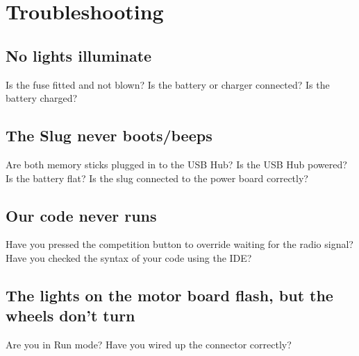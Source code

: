 \documentclass[a4paper, 12pt]{article}
\begin{document}
\section{Troubleshooting}
\subsection{No lights illuminate}
Is the fuse fitted and not blown? Is the battery or charger connected? Is the battery charged?

\subsection{The Slug never boots/beeps}
Are both memory sticks plugged in to the USB Hub? Is the USB Hub powered? Is the battery flat? Is the slug connected to the power board correctly? 

\subsection{Our code never runs}
Have you pressed the competition button to override waiting for the radio signal? Have you checked the syntax of your code using the IDE?

\subsection{The lights on the motor board flash, but the wheels don't turn}
Are you in Run mode? Have you wired up the connector correctly?
\end{document}
